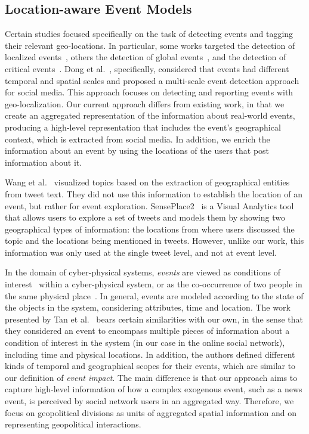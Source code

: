 

\subsection{Location-aware Event Models}\label{sec:geo-related}

Certain studies focused specifically on the task of detecting events and tagging
their relevant geo-locations. 
%
In particular, some works targeted the detection of localized
events~\cite{Watanabe:Jasmine:2011,Abdelhaq:EvenTweet:2013,Walther:2013fb,Lee:A:2011,Krumm:2015},
others the detection of global events~\cite{sankaranarayanan:twitterstand:2009},
and the detection of critical
events~\cite{Sakaki:Tweet:2013,DeLongueville:2009}.  
%
Dong et al.~\cite{Dong2015}, specifically, considered that events had different
temporal and spatial scales and proposed a multi-scale event detection approach
for social media. 
%
This approach focuses on detecting and reporting events with geo-localization.
%
Our current approach differs from existing work, in that we create an aggregated
representation of the information about real-world events, producing a
high-level representation that includes the event's geographical context, which
is extracted from social media. 
%
In addition, we enrich the information about an event by using the locations of
the users that post information about it.

Wang et al.~\cite{Wang:LeadLine:2012} visualized topics based on the extraction
of geographical entities from tweet text. 
%
They did not use this information to establish the location of an event, but
rather for event exploration. 
%
SensePlace2~\cite{MacEachren:SensePlace2:2011} is a Visual Analytics tool that
allows users to explore a set of tweets and models them by showing two
geographical types of information: the locations from where users discussed the
topic and the locations being mentioned in tweets. 
%
However, unlike our work, this information was only used at the single tweet level,
and not at event level.

In the domain of cyber-physical systems, {\em events} are viewed as conditions
of interest~\cite{st-model_2009} within a cyber-physical system, or as the
co-occurrence of two people in the same physical place~\cite{STEvent_2010}.
%
In general, events are modeled according to the state of the objects in the
system, considering attributes, time and location. 
%
The work presented by Tan et al.~\cite{st-model_2009} bears certain similarities
with our own, in the sense that they considered an event to encompass multiple pieces of 
information about a condition of interest in the system (in our case in the
online social network), including time and physical locations. 
%
In addition, the authors defined different kinds of temporal and geographical
scopes for their events, which are similar to our definition of {\em event
impact}. 
%
The main difference is that our approach aims to capture high-level
information of how a complex exogenous event, such as a news event, is perceived
by social network users in an aggregated way. 
%
Therefore, we focus on geopolitical divisions as units of aggregated spatial
information and on representing geopolitical interactions.

